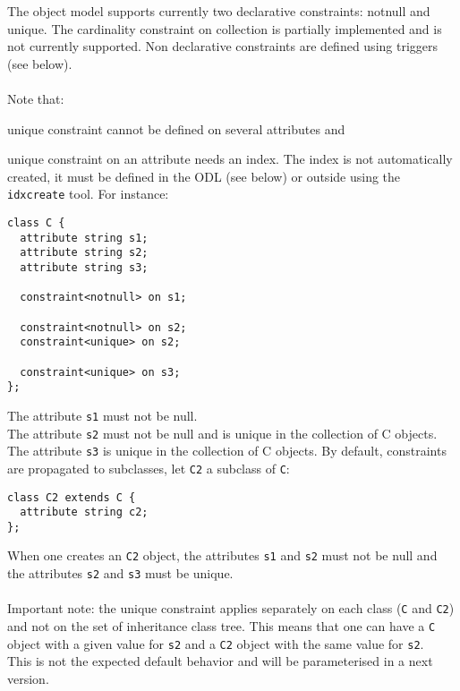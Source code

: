 The object model supports currently two declarative constraints: notnull
and unique. The cardinality constraint on collection is partially
implemented and is not currently supported.
Non declarative constraints are defined using triggers (see below).
\\
\\
Note that:
\bi
\item unique constraint cannot be defined on several attributes and
\item unique constraint on an attribute needs an index. The index is not
automatically created, it must be defined in the ODL (see below)
or outside using the \texttt{idxcreate} tool.
\ei
For instance:
\vspace{-0.2cm}
\begin{verbatim}
class C {
  attribute string s1;
  attribute string s2;
  attribute string s3;

  constraint<notnull> on s1;

  constraint<notnull> on s2;
  constraint<unique> on s2;

  constraint<unique> on s3;
};
\end{verbatim}
The attribute \texttt{s1} must not be null.\\
The attribute \texttt{s2} must not be null and is unique in the collection
of C objects.\\
The attribute \texttt{s3} is unique in the collection
of C objects.
By default, constraints are propagated to subclasses, let \texttt{C2}
a subclass of \texttt{C}:
\vspace{-0.2cm}
\begin{verbatim}
class C2 extends C {
  attribute string c2;
};
\end{verbatim}
When one creates an \texttt{C2} object, the attributes \texttt{s1} and
\texttt{s2} must not be null and the attributes \texttt{s2} and
\texttt{s3} must be unique.\\
\\
Important note: the unique constraint applies separately on each class
(\texttt{C} and \texttt{C2}) and not on the set of inheritance class tree.
This means that one can have a \texttt{C} object with a given value
for \texttt{s2} and a \texttt{C2} object with the same value for \texttt{s2}.
\\
This is not the expected default behavior and will
be parameterised in a next version.
\\
\\
